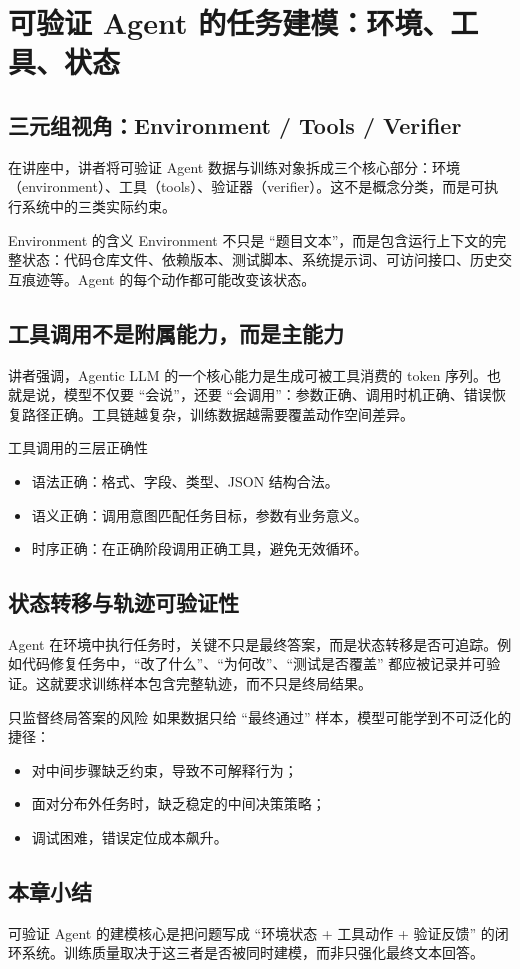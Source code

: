 \section{可验证 Agent 的任务建模：环境、工具、状态}

\subsection{三元组视角：Environment / Tools / Verifier}
在讲座中，讲者将可验证 Agent 数据与训练对象拆成三个核心部分：环境（environment）、工具（tools）、验证器（verifier）。这不是概念分类，而是可执行系统中的三类实际约束。

\begin{knowledgebox}{Environment 的含义}
Environment 不只是 ``题目文本''，而是包含运行上下文的完整状态：代码仓库文件、依赖版本、测试脚本、系统提示词、可访问接口、历史交互痕迹等。Agent 的每个动作都可能改变该状态。
\end{knowledgebox}

\subsection{工具调用不是附属能力，而是主能力}
讲者强调，Agentic LLM 的一个核心能力是生成可被工具消费的 token 序列。也就是说，模型不仅要 ``会说''，还要 ``会调用''：参数正确、调用时机正确、错误恢复路径正确。工具链越复杂，训练数据越需要覆盖动作空间差异。

\begin{importantbox}{工具调用的三层正确性}
\begin{itemize}
    \item 语法正确：格式、字段、类型、JSON 结构合法。
    \item 语义正确：调用意图匹配任务目标，参数有业务意义。
    \item 时序正确：在正确阶段调用正确工具，避免无效循环。
\end{itemize}
\end{importantbox}

\subsection{状态转移与轨迹可验证性}
Agent 在环境中执行任务时，关键不只是最终答案，而是状态转移是否可追踪。例如代码修复任务中，``改了什么''、``为何改''、``测试是否覆盖'' 都应被记录并可验证。这就要求训练样本包含完整轨迹，而不只是终局结果。

\begin{warningbox}{只监督终局答案的风险}
如果数据只给 ``最终通过'' 样本，模型可能学到不可泛化的捷径：
\begin{itemize}
    \item 对中间步骤缺乏约束，导致不可解释行为；
    \item 面对分布外任务时，缺乏稳定的中间决策策略；
    \item 调试困难，错误定位成本飙升。
\end{itemize}
\end{warningbox}

\subsection{本章小结}
可验证 Agent 的建模核心是把问题写成 ``环境状态 + 工具动作 + 验证反馈'' 的闭环系统。训练质量取决于这三者是否被同时建模，而非只强化最终文本回答。

